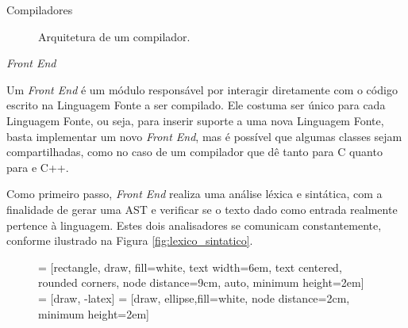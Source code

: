 \begin{section}{Compiladores}
\begin{figure}
\begin{center}
{
}
\end{center}

\caption{Arquitetura de um compilador.}
\label{fig:compiler_arch}
\end{figure}

\begin{subsection}{\textit{Front End}}

Um \textit{Front End} é um módulo responsável por interagir diretamente com o
código escrito na Linguagem Fonte a ser compilado. Ele costuma ser único
para cada Linguagem Fonte, ou seja, para inserir suporte a uma nova
Linguagem Fonte, basta implementar um novo \textit{Front End}, mas é
possível que algumas classes sejam
compartilhadas, como no caso de um compilador que dê tanto para C quanto para e C++.


Como primeiro passo, \textit {Front End} realiza uma análise
léxica e sintática, com a finalidade de gerar uma AST e verificar
se o texto dado como entrada realmente pertence à linguagem.
Estes dois analisadores se comunicam constantemente, conforme ilustrado na Figura
\ref{fig:lexico_sintatico}.


\begin{figure}
 = [rectangle, draw, fill=white,
    text width=6em, text centered, rounded corners, node distance=9cm, auto, minimum height=2em]
 = [draw, -latex]
 = [draw, ellipse,fill=white, node distance=2cm,
    minimum height=2em]

\begin{center}
\end{center}
\end{figure}
\end{subsection}
\end{section}
